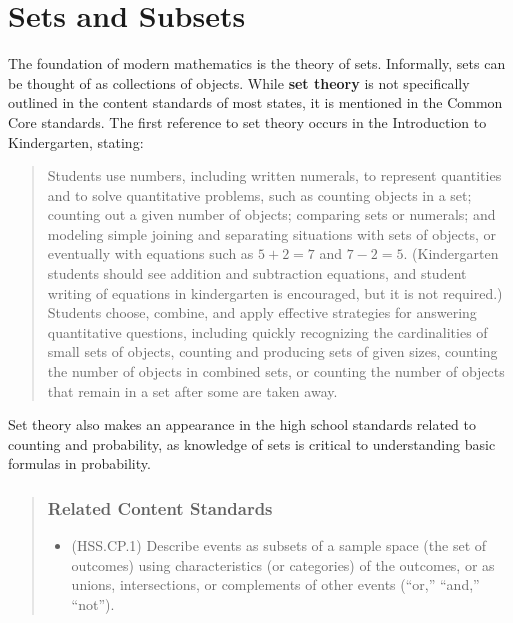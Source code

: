 \documentclass[
]{book}
\providecommand{\tightlist}{%
  \setlength{\itemsep}{0pt}\setlength{\parskip}{0pt}}
\theoremstyle{definition}
\theoremstyle{definition}
\theoremstyle{definition}
\theoremstyle{remark}
\begin{document}
\hypertarget{sets-and-subsets}{%
\section{Sets and Subsets}\label{sets-and-subsets}}

The foundation of modern mathematics is the theory of sets. Informally, sets can be thought of as collections of objects. While \textbf{set theory} is not specifically outlined in the content standards of most states, it is mentioned in the Common Core standards. The first reference to set theory occurs in the Introduction to Kindergarten, stating:

\begin{quote}
Students use numbers, including written numerals, to represent quantities and to solve quantitative problems, such as counting objects in a set; counting out a given number of objects; comparing sets or numerals; and modeling simple joining and separating situations with sets of objects, or eventually with equations such as \(5 + 2 = 7\) and \(7 - 2 = 5\). (Kindergarten students should see addition and subtraction equations, and student writing of equations in kindergarten is encouraged, but it is not required.) Students choose, combine, and apply effective strategies for answering quantitative questions, including quickly recognizing the cardinalities of small sets of objects, counting and producing sets of given sizes, counting the number of objects in combined sets, or counting the number of objects that remain in a set after some are taken away. \citep{CCSS}
\end{quote}

Set theory also makes an appearance in the high school standards related to counting and probability, as knowledge of sets is critical to understanding basic formulas in probability.

\begin{quote}
\hypertarget{related-content-standards-1}{%
\subsubsection*{Related Content Standards}\label{related-content-standards-1}}

\begin{itemize}
\tightlist
\item
  (HSS.CP.1) Describe events as subsets of a sample space (the set of outcomes) using characteristics (or categories) of the outcomes, or as unions, intersections, or complements of other events (``or,'' ``and,'' ``not'').
\end{itemize}
\end{quote}
\end{document}
